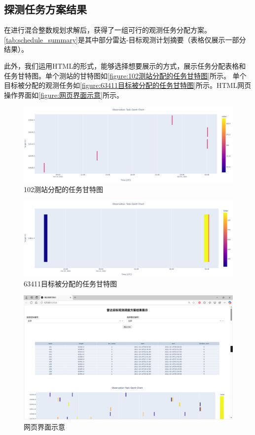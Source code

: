 \documentclass[openany,12pt,UTF8]{ctexart}
\begin{document}
\subsection{探测任务方案结果}
在进行混合整数规划求解后，获得了一组可行的观测任务分配方案。\autoref{tab:schedule_summary}是其中部分雷达-目标观测计划摘要（表格仅展示一部分结果）。

此外，我们运用HTML的形式，能够选择想要展示的方式，展示任务分配表格和任务甘特图。单个测站的甘特图如\autoref{figure:102测站分配的任务甘特图}所示。
单个目标被分配的观测任务如\autoref{figure:63411目标被分配的任务甘特图}所示。HTML网页操作界面如\autoref{figure:网页界面示意}所示。
\begin{figure}[h]\centering
    \includegraphics[width=\columnwidth]{figures/102测站.png}
    \caption{102测站分配的任务甘特图}
    \label{figure:102测站分配的任务甘特图}
\end{figure}
\begin{figure}[h]\centering
    \includegraphics[width=\columnwidth]{figures/63411目标.png}
    \caption{63411目标被分配的任务甘特图}
    \label{figure:63411目标被分配的任务甘特图}
\end{figure}
\begin{figure}[h]\centering
    \includegraphics[width=\columnwidth]{figures/网页界面示意.png}
    \caption{网页界面示意}
    \label{figure:网页界面示意}
\end{figure}
\end{document}
